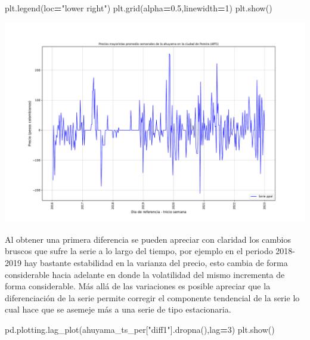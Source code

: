 \documentclass[
]{book}
\newenvironment{Shaded}{\begin{snugshade}}{\end{snugshade}}
\newcommand{\DecValTok}[1]{\textcolor[rgb]{0.00,0.00,0.81}{#1}}
\newcommand{\FloatTok}[1]{\textcolor[rgb]{0.00,0.00,0.81}{#1}}
\newcommand{\NormalTok}[1]{#1}
\newcommand{\OperatorTok}[1]{\textcolor[rgb]{0.81,0.36,0.00}{\textbf{#1}}}
\newcommand{\StringTok}[1]{\textcolor[rgb]{0.31,0.60,0.02}{#1}}
\begin{document}
\begin{Shaded}
\begin{Highlighting}[]
\NormalTok{plt.legend(loc}\OperatorTok{=}\StringTok{"lower right"}\NormalTok{)}
\NormalTok{plt.grid(alpha}\OperatorTok{=}\FloatTok{0.5}\NormalTok{,linewidth}\OperatorTok{=}\DecValTok{1}\NormalTok{)}
\NormalTok{plt.show()}
\end{Highlighting}
\end{Shaded}

\includegraphics{bookdown-demo_files/figure-latex/unnamed-chunk-90-65.pdf}

Al obtener una primera diferencia se pueden apreciar con claridad los cambios bruscos que sufre la serie a lo largo del tiempo, por ejemplo en el periodo 2018-2019 hay bastante estabilidad en la varianza del precio, esto cambia de forma considerable hacia adelante en donde la volatilidad del mismo incrementa de forma considerable. Más allá de las variaciones es posible apreciar que la diferenciación de la serie permite corregir el componente tendencial de la serie lo cual hace que se asemeje más a una serie de tipo estacionaria.

\begin{Shaded}
\begin{Highlighting}[]

\NormalTok{pd.plotting.lag\_plot(ahuyama\_ts\_per[}\StringTok{"diff1"}\NormalTok{].dropna(),lag}\OperatorTok{=}\DecValTok{3}\NormalTok{)}
\NormalTok{plt.show()}
\end{Highlighting}
\end{Shaded}
\end{document}
